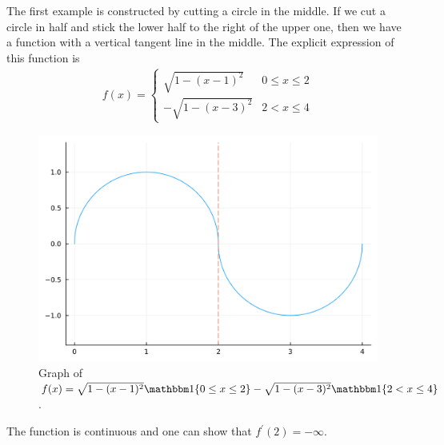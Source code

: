 \documentclass[thmcnt=section, 12pt]{my-elegantbook}
\begin{document}
\begin{example}
    The first example is constructed by cutting a circle in the middle. If we cut a circle in half and stick the lower half to the right of the upper one, then we have a function with a vertical tangent line in the middle. The explicit expression of this function is
    \begin{align*}
        f(x) = \begin{cases}
                   \sqrt{1 - (x-1)^2}   & 0 \leq x \leq 2 \\
                   - \sqrt{1 - (x-3)^2} & 2 < x \leq 4
               \end{cases}
    \end{align*}

    \begin{figure}[ht]
        \centering
        \includegraphics[scale=0.2]{figures/graph-002.png}
        \caption{Graph of $f(x) = \sqrt{1-(x-1)^2}\ind\{0 \leq x \leq 2\} - \sqrt{1-(x-3)^2}\ind\{2 < x \leq 4\}$.}
    \end{figure}

    \noindent The function is continuous and one can show that $f^\prime(2) = -\infty$.
    \label{eg:1}
\end{example}
\end{document}
